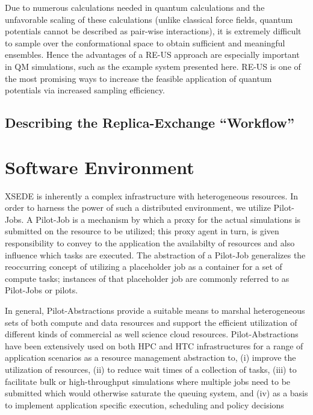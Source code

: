 \documentclass{sig-alternate}
\begin{document}
Due to numerous calculations needed in quantum calculations and the unfavorable
scaling of these calculations (unlike classical force fields, quantum 
potentials cannot be described as pair-wise interactions), it is extremely 
difficult to sample over the conformational space to obtain sufficient and 
meaningful ensembles.  Hence the advantages of a RE-US approach are especially 
important in QM simulations, such as the example system presented here.  RE-US
is one of the most promising ways to increase the feasible application of 
quantum potentials via increased sampling efficiency.

\subsection{Describing the Replica-Exchange ``Workflow'' } \label{}


\section{Software Environment}

XSEDE is inherently a complex infrastructure with heterogeneous
resources. In order to harness the power of such a distributed
environment, we utilize Pilot-Jobs. A Pilot-Job is a mechanism by 
which a proxy for the actual simulations
is submitted on the resource to be utilized; this proxy agent in turn,
is given responsibility to convey to the application the availabilty
of resources and also influence which tasks are executed. The
abstraction of a Pilot-Job generalizes the reoccurring concept of
utilizing a placeholder job as a container for a set of compute tasks;
instances of that placeholder job are commonly referred to as
Pilot-Jobs or pilots. 

In general, Pilot-Abstractions provide a suitable means to marshal
heterogeneous sets of both compute and data resources and support the
efficient utilization of different kinds of commercial as well science
cloud resources. Pilot-Abstractions have been extensively used on both
HPC and HTC infrastructures for a range of application scenarios as a
resource management abstraction to, (i) improve the utilization of
resources, (ii) to reduce wait times of a collection of tasks, (iii)
to facilitate bulk or high-throughput simulations where multiple jobs
need to be submitted which would otherwise saturate the queuing
system, and (iv) as a basis to implement application specific
execution, scheduling and policy decisions
\end{document}
